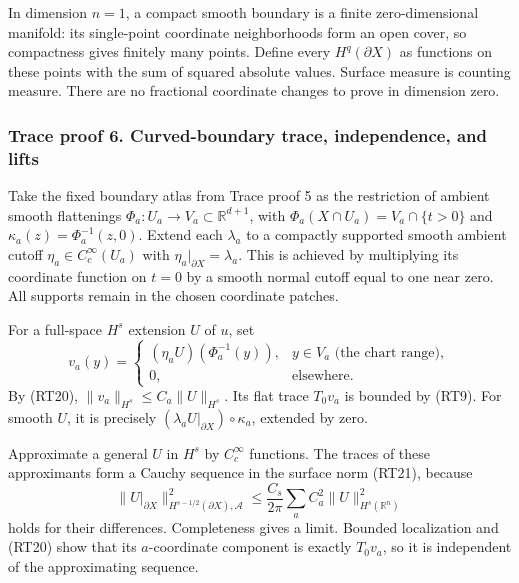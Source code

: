\documentclass[
  11pt,
]{article}
\makeatletter
\let\ReaderOriginalAnchorStart\hyper@anchorstart
\let\ReaderOriginalAnchorEnd\hyper@anchorend
\let\ReaderPendingAliases\@empty
\def\ReaderArmAliases#1{\gdef\ReaderPendingAliases{#1}}
\def\hyper@anchorstart#1{\ReaderIfNativeAnchorTF{#1}{\ReaderPendingAliases\global\let\ReaderPendingAliases\@empty}{}\ReaderOriginalAnchorStart{#1}}
\makeatother
\begin{document}
In dimension \(n=1\), a compact smooth boundary is a finite
zero-dimensional manifold: its single-point coordinate neighborhoods
form an open cover, so compactness gives finitely many points. Define
every \(H^q(\partial X)\) as functions on these points with the sum of
squared absolute values. Surface measure is counting measure. There are
no fractional coordinate changes to prove in dimension zero.

\ReaderArmAliases{\ReaderOriginalAnchorStart{trace-proof-6-curved-boundary-trace-independence-and-lifts}\ReaderOriginalAnchorEnd\begingroup\expandafter\def\csname @currentHref\endcsname{trace-proof-6-curved-boundary-trace-independence-and-lifts}\label{trace-proof-6-curved-boundary-trace-independence-and-lifts}\endgroup\ReaderOriginalAnchorStart{trace-proof-6.-curved-boundary-trace-independence-and-lifts}\ReaderOriginalAnchorEnd}
\subsubsection{Trace proof 6. Curved-boundary trace, independence, and
lifts}\label{trace-proof-6.-curved-boundary-trace-independence-and-lifts}

Take the fixed boundary atlas from Trace proof 5 as the restriction of
ambient smooth flattenings \(\Phi_a:U_a\to V_a\subset\mathbb R^{d+1}\),
with \(\Phi_a(X\cap U_a)=V_a\cap\{t>0\}\) and
\(\kappa_a(z)=\Phi_a^{-1}(z,0)\). Extend each \(\lambda_a\) to a
compactly supported smooth ambient cutoff \(\eta_a\in C_c^\infty(U_a)\)
with \(\eta_a|_{\partial X}=\lambda_a\). This is achieved by multiplying
its coordinate function on \(t=0\) by a smooth normal cutoff equal to
one near zero. All supports remain in the chosen coordinate patches.

For a full-space \(H^s\) extension \(U\) of \(u\), set \[
 v_a(y)=
 \begin{cases}
  (\eta_aU)(\Phi_a^{-1}(y)),&y\in V_a\text{ (the chart range)},\\
  0,&\text{elsewhere}.
 \end{cases}
 \tag{RT24}
\] By (RT20), \(\|v_a\|_{H^s}\leq C_a\|U\|_{H^s}\). Its flat trace
\(T_0v_a\) is bounded by (RT9). For smooth \(U\), it is precisely
\((\lambda_aU|_{\partial X})\circ\kappa_a\), extended by zero.

Approximate a general \(U\) in \(H^s\) by \(C_c^\infty\) functions. The
traces of these approximants form a Cauchy sequence in the surface norm
(RT21), because \[
 \|U|_{\partial X}\|_{H^{s-1/2}(\partial X),\mathcal A}^2
 \leq\frac{C_s}{2\pi}\sum_a C_a^2\|U\|_{H^s(\mathbb R^n)}^2
 \tag{RT25}
\] holds for their differences. Completeness gives a limit. Bounded
localization and (RT20) show that its \(a\)-coordinate component is
exactly \(T_0v_a\), so it is independent of the approximating sequence.
\end{document}
